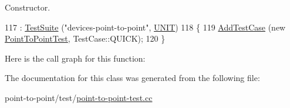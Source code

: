 Constructor. 


\begin{DoxyCode}
117   : \hyperlink{classns3_1_1TestSuite_a904b0c40583b744d30908aeb94636d1a}{TestSuite} (\textcolor{stringliteral}{"devices-point-to-point"}, \hyperlink{classns3_1_1TestSuite_a1ebfcab34ec8161e085e8e3a1855eae0a3885375a3787abf60431f8454b3cadbd}{UNIT})
118 \{
119   \hyperlink{classns3_1_1TestCase_a3718088e3eefd5d6454569d2e0ddd835}{AddTestCase} (\textcolor{keyword}{new} \hyperlink{classPointToPointTest}{PointToPointTest}, TestCase::QUICK);
120 \}
\end{DoxyCode}


Here is the call graph for this function\+:




The documentation for this class was generated from the following file\+:\begin{DoxyCompactItemize}
\item 
point-\/to-\/point/test/\hyperlink{point-to-point-test_8cc}{point-\/to-\/point-\/test.\+cc}\end{DoxyCompactItemize}
